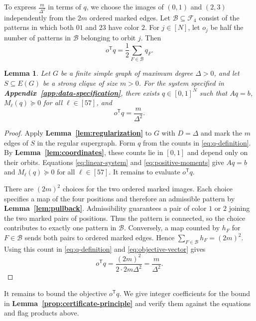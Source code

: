 \documentclass[preprint,11pt,numbers]{elsarticle-arxiv}
\numberwithin{equation}{section}
\newtheorem{lemma}[theorem]{Lemma}
\theoremstyle{definition}
\begin{document}
To express $\frac{m}{\Delta^2}$ in terms of $q$, we choose the
images of $(0,1)$ and $(2,3)$ independently from the $2m$ ordered
marked edges. Let $\mathcal B\subseteq\mathcal F_4$ consist of the
patterns in which both $01$ and $23$ have color $2$. For $j\in[N]$,
let $o_j$ be half the number of patterns in $\mathcal B$ belonging
to orbit $j$. Then
\begin{equation}\label{eq:objective-vector}
 o^{\mathsf T}q=\frac{1}{2}\sum_{F\in\mathcal B}q_F.
\end{equation}

\begin{lemma}\label{lem:finite-encoding}\label{lem:objective}
Let $G$ be a finite simple graph of maximum degree $\Delta>0$, and
let $S\subseteq E(G)$ be a strong clique of size $m>0$. For the system
specified in \textbf{Appendix~\ref{app:data-specification}}, there exists
$q\in[0,1]^N$ such that $Aq=b$, $M_\ell(q)\succeq0$ for all
$\ell\in[57]$, and
\begin{equation}\label{eq:objective-value}
 o^{\mathsf T}q=\frac{m}{\Delta^2}.
\end{equation}
\end{lemma}

\begin{proof}
Apply \textbf{Lemma~\ref{lem:regularization}} to $G$ with $D=\Delta$
and mark the $m$ edges of $S$ in the regular supergraph. Form $q$
from the counts in \eqref{eq:q-definition}. By
\textbf{Lemma~\ref{lem:coordinates}}, these counts lie in $[0,1]$
and depend only on their orbits. Equations \eqref{eq:linear-system}
and \eqref{eq:positive-moments} give $Aq=b$ and $M_\ell(q)\succeq0$
for all $\ell\in[57]$. It remains to evaluate $o^{\mathsf T}q$.

There are $(2m)^2$ choices for the two ordered marked images.
Each choice specifies a map of the four positions and therefore
an admissible pattern by \textbf{Lemma~\ref{lem:pullback}}.
Admissibility guarantees a pair of color $1$ or $2$ joining the
two marked pairs of positions. Thus the pattern is connected,
so the choice contributes to exactly one pattern in $\mathcal B$.
Conversely, a map counted by $h_F$ for $F\in\mathcal B$ sends both
pairs to ordered marked edges. Hence $\sum_{F\in\mathcal B}h_F=(2m)^2$.
Using this count in \eqref{eq:q-definition} and
\eqref{eq:objective-vector} gives
\[
 o^{\mathsf T}q
 =\frac{(2m)^2}{2\cdot2m\Delta^2}
 =\frac{m}{\Delta^2}.
\]
\end{proof}

It remains to bound the objective $o^{\mathsf T}q$. We give integer
coefficients for the bound in \textbf{Lemma~\ref{prop:certificate-principle}}
and verify them against the equations and flag products above.
\end{document}
